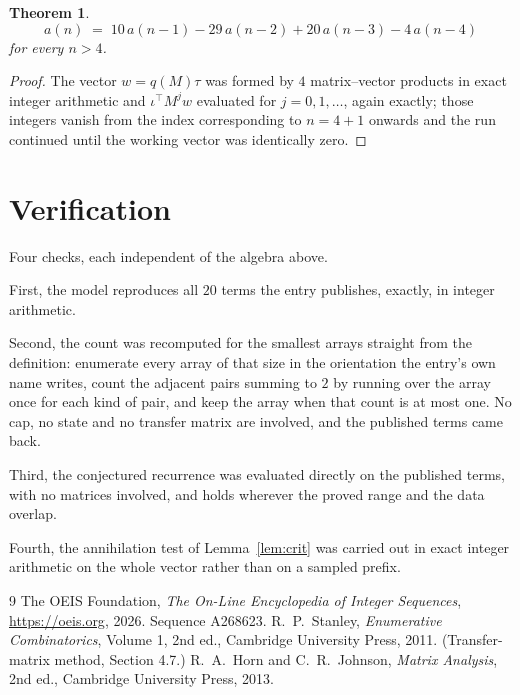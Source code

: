 \documentclass[11pt,a4paper]{article}
\theoremstyle{plain}
\newtheorem{theorem}{Theorem}
\theoremstyle{definition}
\begin{document}
\begin{theorem}
\[
a(n)\;=\;10\,a(n-1) - 29\,a(n-2) + 20\,a(n-3) - 4\,a(n-4)
\]
for every $n>4$.
\end{theorem}

\begin{proof}
The vector $w=q(M)\tau$ was formed by $4$ matrix--vector products in exact integer
arithmetic and $\iota^{\!\top}M^{j}w$ evaluated for $j=0,1,\dots$, again exactly; those
integers vanish from the index corresponding to $n=4+1$ onwards and the run continued
until the working vector was identically zero.
\end{proof}

\section{Verification}

Four checks, each independent of the algebra above.

First, the model reproduces all $20$ terms the entry publishes, exactly, in integer
arithmetic.

Second, the count was recomputed for the smallest arrays straight from the definition:
enumerate every array of that size in the orientation the entry's own name writes, count the
adjacent pairs summing to $2$ by running over the array once for each kind of pair, and keep
the array when that count is at most one. No cap, no state and no transfer matrix are involved, and
the published terms came back.

Third, the conjectured recurrence was evaluated directly on the published terms, with no
matrices involved, and holds wherever the proved range and the data overlap.

Fourth, the annihilation test of Lemma~\ref{lem:crit} was carried out in exact integer
arithmetic on the whole vector rather than on a sampled prefix.

\begin{thebibliography}{9}
 The OEIS Foundation, \emph{The On-Line Encyclopedia of Integer
Sequences}, \url{https://oeis.org}, 2026. Sequence A268623.
 R.~P.~Stanley, \emph{Enumerative Combinatorics}, Volume 1, 2nd ed.,
Cambridge University Press, 2011. (Transfer-matrix method, Section 4.7.)
 R.~A.~Horn and C.~R.~Johnson, \emph{Matrix Analysis}, 2nd ed., Cambridge
University Press, 2013.
\end{thebibliography}
\end{document}
